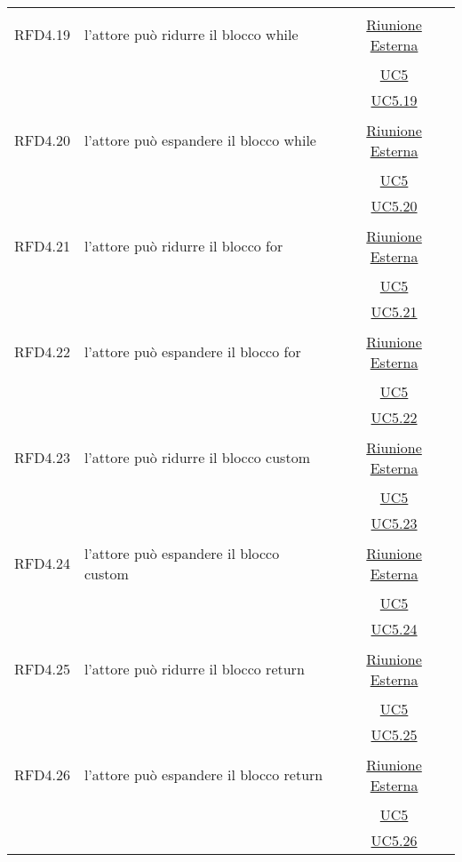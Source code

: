 \begin{longtable}{|c|>{\centering}m{7cm}|c|}
\hypertarget{RFD4.19}{RFD4.19} & l'attore può ridurre il blocco while & \hyperlink{Riunione Esterna}{Riunione Esterna}\\
& &\hyperref[UC5]{UC5}\\
& & \hyperref[UC5.19]{UC5.19}\\ \hline

\hypertarget{RFD4.20}{RFD4.20} & l'attore può espandere il blocco while &  \hyperlink{Riunione Esterna}{Riunione Esterna}\\
& &\hyperref[UC5]{UC5}\\
& &\hyperref[UC5.20]{UC5.20}\\ \hline

\hypertarget{RFD4.21}{RFD4.21} & l'attore può ridurre il blocco for & \hyperlink{Riunione Esterna}{Riunione Esterna}\\
& &\hyperref[UC5]{UC5}\\
& & \hyperref[UC5.21]{UC5.21}\\ \hline

\hypertarget{RFD4.22}{RFD4.22} & l'attore può espandere il blocco for &  \hyperlink{Riunione Esterna}{Riunione Esterna}\\
& &\hyperref[UC5]{UC5}\\
& &\hyperref[UC5.22]{UC5.22}\\ \hline

\hypertarget{RFD4.23}{RFD4.23} & l'attore può ridurre il blocco custom & \hyperlink{Riunione Esterna}{Riunione Esterna}\\
& &\hyperref[UC5]{UC5}\\
& & \hyperref[UC5.23]{UC5.23}\\ \hline

\hypertarget{RFD4.24}{RFD4.24} & l'attore può espandere il blocco custom &  \hyperlink{Riunione Esterna}{Riunione Esterna}\\
& &\hyperref[UC5]{UC5}\\
& &\hyperref[UC5.24]{UC5.24}\\ \hline

\hypertarget{RFD4.25}{RFD4.25} & l'attore può ridurre il blocco return & \hyperlink{Riunione Esterna}{Riunione Esterna}\\
& &\hyperref[UC5]{UC5}\\
& & \hyperref[UC5.25]{UC5.25}\\ \hline

\hypertarget{RFD4.26}{RFD4.26} & l'attore può espandere il blocco return &  \hyperlink{Riunione Esterna}{Riunione Esterna}\\
& &\hyperref[UC5]{UC5}\\
& &\hyperref[UC5.26]{UC5.26}\\ \hline


\end{longtable}
